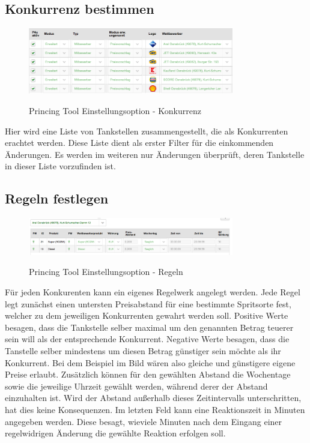 \subsection{Konkurrenz bestimmen}
\begin{figure}[!ht]
	\center
	\includegraphics[width=0.8\textwidth]{Bilder/konkurenz.png}\\
	\caption{Princing Tool Einstellungsoption - Konkurrenz}
	\label{fig:PTK}
\end{figure}
Hier wird eine Liste von Tankstellen zusammengestellt, die als Konkurrenten erachtet werden. Diese Liste dient als erster Filter für die einkommenden Änderungen. Es werden im weiteren nur Änderungen überprüft, deren Tankstelle in dieser Liste vorzufinden ist.

\subsection{Regeln festlegen}
\begin{figure}[!ht]
	\center
	\includegraphics[width=0.8\textwidth]{Bilder/regeln1.png}\\
	\caption{Princing Tool Einstellungsoption - Regeln}
	\label{fig:PTR}
\end{figure}
Für jeden Konkurenten kann ein eigenes Regelwerk angelegt werden. Jede Regel legt zunächst einen untersten Preisabstand für eine bestimmte Spritsorte fest, welcher zu dem jeweiligen Konkurrenten gewahrt werden soll. Positive Werte besagen, dass die Tankstelle selber maximal um den genannten Betrag teuerer sein will als der entsprechende Konkurrent. Negative Werte besagen, dass die Tanstelle selber mindestens um diesen Betrag günstiger sein möchte als ihr Konkurrent. Bei dem Beispiel im Bild wären also gleiche und günstigere eigene Preise erlaubt. Zusätzlich können für den gewählten Abstand die Wochentage sowie die jeweilige Uhrzeit gewählt werden, während derer der Abstand einzuhalten ist. Wird der Abstand außerhalb dieses Zeitintervalls unterschritten, hat dies keine Konsequenzen. Im letzten Feld kann eine Reaktionszeit in Minuten angegeben werden. Diese besagt, wieviele Minuten nach dem Eingang einer regelwidrigen Änderung die gewählte Reaktion erfolgen soll.

